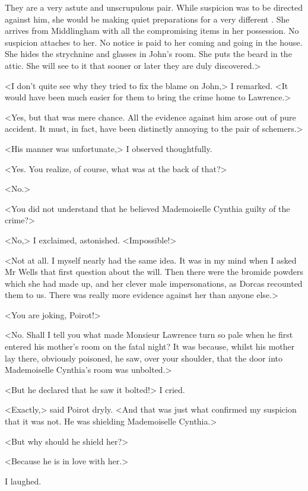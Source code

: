  They are a very astute and unscrupulous pair. While suspicion was to be directed against him, she would be making quiet preparations for a very different . She arrives from Middlingham with all the compromising items in her possession. No suspicion attaches to her. No notice is paid to her coming and going in the house. She hides the strychnine and glasses in John's room. She puts the beard in the attic. She will see to it that sooner or later they are duly discovered.> 

 <I don't quite see why they tried to fix the blame on John,> I remarked. <It would have been much easier for them to bring the crime home to Lawrence.> 

 <Yes, but that was mere chance. All the evidence against him arose out of pure accident. It must, in fact, have been distinctly annoying to the pair of schemers.> 

 <His manner was unfortunate,> I observed thoughtfully. 

 <Yes. You realize, of course, what was at the back of that?> 

 <No.> 

 <You did not understand that he believed Mademoiselle Cynthia guilty of the crime?> 

 <No,> I exclaimed, astonished. <Impossible!> 

 <Not at all. I myself nearly had the same idea. It was in my mind when I asked Mr Wells that first question about the will. Then there were the bromide powders which she had made up, and her clever male impersonations, as Dorcas recounted them to us. There was really more evidence against her than anyone else.> 

 <You are joking, Poirot!> 

 <No. Shall I tell you what made Monsieur Lawrence turn so pale when he first entered his mother's room on the fatal night? It was because, whilst his mother lay there, obviously poisoned, he saw, over your shoulder, that the door into Mademoiselle Cynthia's room was unbolted.> 

 <But he declared that he saw it bolted!> I cried. 

 <Exactly,> said Poirot dryly. <And that was just what confirmed my suspicion that it was not. He was shielding Mademoiselle Cynthia.> 

 <But why should he shield her?> 

 <Because he is in love with her.> 

 I laughed. 

